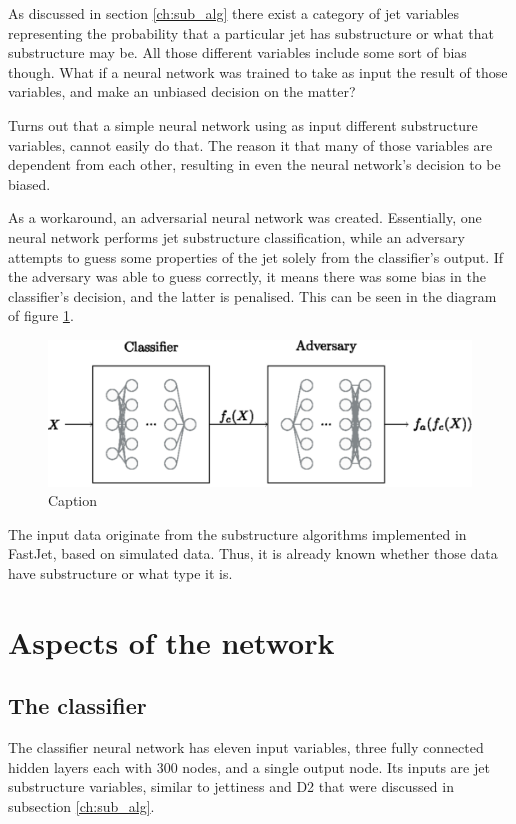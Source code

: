As discussed in section \ref{ch:sub_alg} there exist a category of jet variables representing the probability that a particular jet has substructure or what that substructure may be. All those different variables include some sort of bias though. What if a neural network was trained to take as input the result of those variables, and make an unbiased decision on the matter? 

Turns out that a simple neural network using as input different substructure variables, cannot easily do that. The reason it that many of those variables are dependent from each other, resulting in even the neural network's decision to be biased. 

As a workaround, an adversarial neural network \cite{shimmin2017decorrelated} was created. Essentially, one neural network performs jet substructure classification, while an adversary attempts to guess some properties of the jet solely from the classifier's output. If the adversary was able to guess correctly, it means there was some bias in the classifier's decision, and the latter is penalised. This can be seen in the diagram of figure \ref{fig:achitecture}.

 
\begin{figure}[H]
    \centering
    \includegraphics[width=\textwidth]{images/annarchitecture.jpeg}
    \caption{Caption}
    \label{fig:achitecture}
\end{figure}


The input data originate from the substructure algorithms implemented in FastJet, based on simulated data. Thus, it is already known whether those data have substructure or what type it is.


\section{Aspects of the network}

\subsection{The classifier}
The classifier neural network has eleven input variables, three fully connected hidden layers each with 300 nodes, and a single output node. Its inputs are jet substructure variables, similar to jettiness and D2 that were discussed in subsection \ref{ch:sub_alg}.

